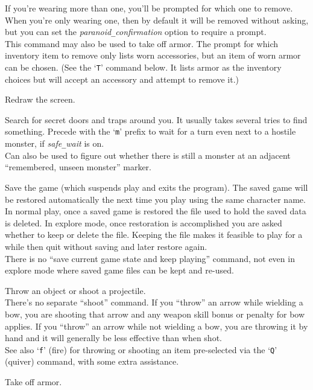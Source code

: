 If you're wearing more than one, you'll be prompted for which one to
remove.  When you're only wearing one, then by default it will be removed
without asking, but you can set the
{\it paranoid\verb+_+confirmation\/}
option to require a prompt.\\
This command may also be used to take off armor.  The prompt for which
inventory item to remove only lists worn accessories, but an item of
worn armor can be chosen.
(See the `{\tt T}' command below.  It lists armor as the inventory
choices but will accept an accessory and attempt to remove it.)
\item[\tb{\^{}R}]
Redraw the screen.
\item[\tb{s}]
Search for secret doors and traps around you.
It usually takes several tries to find something.
Precede with the `{\tt m}' prefix to wait for a turn
even next to a hostile monster, if {\it safe\verb+_+wait\/}
is on.\\
Can also be used to figure out whether there is still a monster at
an adjacent ``remembered, unseen monster'' marker.
\item[\tb{S}]
Save the game (which suspends play and exits the program).
The saved game will be restored automatically the next time you play
using the same character name.\\
In normal play, once a saved game is restored the file used to hold
the saved data is deleted.
In explore mode, once restoration is accomplished you are asked whether
to keep or delete the file.
Keeping the file makes it feasible to play for a while then quit
without saving and later restore again.\\
There is no ``save current game state and keep playing'' command, not
even in explore mode where saved game files can be kept and re-used.
\item[\tb{t}]
Throw an object or shoot a projectile.\\
There's no separate ``shoot'' command.
If you ``throw'' an arrow while wielding a bow, you are shooting
that arrow and any weapon skill bonus or penalty for bow applies.
If you ``throw'' an arrow while not wielding a bow, you are throwing
it by hand and it will generally be less effective than when shot.\\
See also `{\tt f}' (fire) for throwing or shooting an item pre-selected
via the `{\tt Q}' (quiver) command, with some extra assistance.
\item[\tb{T}]
Take off armor.\\
